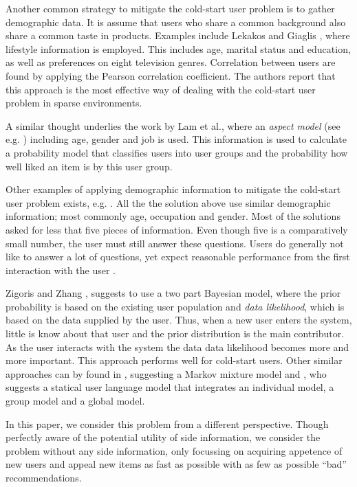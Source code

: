 \documentclass[twoside,leqno,twocolumn]{article}
\newcommand{\jm}[1]{{\color{TealBlue}(jm) #1\color{black}}}
\newcommand{\hai}[1]{\color{blue}(hai) #1\color{black}}
\begin{document}
Another common strategy to mitigate the cold-start user problem is to gather demographic data. It is assume that users who share a common background also share a common taste in products. Examples include Lekakos and Giaglis \cite{lekakos07}, where lifestyle information is employed. This includes age, marital status and education, as well as preferences on eight television genres. Correlation between users are found by applying the Pearson correlation coefficient. The authors report that this approach is the most effective way of dealing with the cold-start user problem in sparse environments.

A similar thought underlies the work by Lam et al., \cite{lam08:_addres} where an \textit{aspect model} (see e.g. \cite{marlin04:_collab}) including age, gender and job is used. This information is used to calculate a probability model that classifies users into user groups and the probability how well liked an item is by this user group. 

Other examples of applying demographic information to mitigate the cold-start user problem exists, e.g. \cite{gao07:_person,agarwal09:_regres,park09:_pairw}. All the the solution above use similar demographic information; most commonly age, occupation and gender. Most of the solutions asked for less that five pieces of information. Even though five is a comparatively small number, the user must still answer these questions. Users do generally not like to answer a lot of questions, yet expect reasonable performance from the first interaction with the user \cite{zigoris06:_bayes}. 

Zigoris and Zhang \cite{zigoris06:_bayes}, suggests to use a two part Bayesian model, where the prior probability is based on the existing user population and \textit{data likelihood}, which is based on the data supplied by the user. Thus, when a new user enters the system, little is know about that user and the prior distribution is the main contributor. As the user interacts with the system the data data likelihood becomes more and more important. This approach performs well for cold-start users. Other similar approaches can by found in \cite{manavoglu03:_probab}, suggesting a Markov mixture model and \cite{xue09:_user}, who suggests a statical user language model that integrates an individual model, a group model and a global model.

In this paper, we consider this problem from a different
perspective. Though perfectly aware of the potential utility of side
information, we consider the problem without any side information,
only focussing on acquiring appetence of new users and appeal new
items as fast as possible with as few as possible ``bad'' recommendations.
\end{document}
